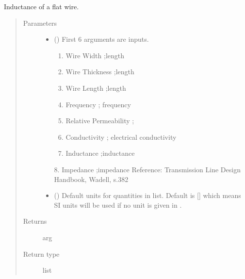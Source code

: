 \documentclass[letterpaper,10pt,english]{sphinxmanual}
\begin{document}

\begin{fulllineitems}
\label{\detokenize{components:components.L_StraightFlatWire}}
Inductance of a flat wire.
\begin{quote}\begin{description}
\item[{Parameters}] \leavevmode\begin{itemize}
\item {} 
 () \textendash{} 
First 6 arguments are inputs.
\begin{enumerate}
%
\item {} 
Wire Width ;length

\item {} 
Wire Thickness ;length

\item {} 
Wire Length ;length

\item {} 
Frequency ; frequency

\item {} 
Relative Permeability ;

\item {} 
Conductivity ; electrical conductivity

\item {} 
Inductance ;inductance

\end{enumerate}

8.  Impedance ;impedance
Reference:  Transmission Line Design Handbook, Wadell, s.382


\item {} 
 (\sphinxstyleliteralemphasis{\sphinxupquote{, }}) \textendash{} Default units for quantities in  list. Default is {[}{]} which means SI units will be used if no unit is given in .

\end{itemize}

\item[{Returns}] \leavevmode
arg

\item[{Return type}] \leavevmode
list

\end{description}\end{quote}

\end{fulllineitems}
\end{document}
